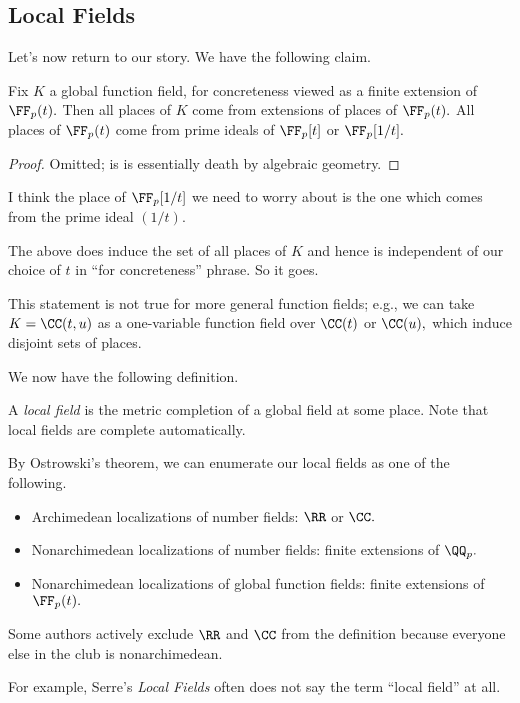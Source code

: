\subsection{Local Fields}
Let's now return to our story. We have the following claim.
\begin{proposition}
	Fix $K$ a global function field, for concreteness viewed as a finite extension of $\FF_p(t).$ Then all places of $K$ come from extensions of places of $\FF_p(t).$ All places of $\FF_p(t)$ come from prime ideals of $\FF_p[t]$ or $\FF_p[1/t].$
\end{proposition}
\begin{proof}
	Omitted; is is essentially death by algebraic geometry.
\end{proof}
\begin{remark}[Nir]
	I think the place of $\FF_p[1/t]$ we need to worry about is the one which comes from the prime ideal $(1/t).$
\end{remark}
\begin{remark}
	The above does induce the set of all places of $K$ and hence is independent of our choice of $t$ in ``for concreteness'' phrase. So it goes.
\end{remark}
\begin{remark}
	This statement is not true for more general function fields; e.g., we can take $K=\CC(t,u)$ as a one-variable function field over $\CC(t)$ or $\CC(u),$ which induce disjoint sets of places.
\end{remark}
We now have the following definition.
\begin{definition}
	A \textit{local field} is the metric completion of a global field at some place. Note that local fields are complete automatically.
\end{definition}
\begin{example}
	By Ostrowski's theorem, we can enumerate our local fields as one of the following.
	\begin{itemize}
		\item Archimedean localizations of number fields: $\RR$ or $\CC.$
		\item Nonarchimedean localizations of number fields: finite extensions of $\QQ_p.$
		\item Nonarchimedean localizations of global function fields: finite extensions of $\FF_p(t).$
	\end{itemize}
\end{example}
\begin{warn}
	Some authors actively exclude $\RR$ and $\CC$ from the definition because everyone else in the club is nonarchimedean.
\end{warn}
For example, {Serre}'s \textit{Local Fields} often does not say the term ``local field'' at all.

